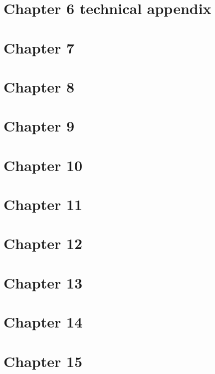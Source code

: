\documentclass[10pt]{article}
\begin{document}
  \newpage
  \section*{Chapter 6 technical appendix}
  
  
  \newpage
  \section*{Chapter 7}
  
  
  \newpage
  \section*{Chapter 8}
  
  
  \newpage
  \section*{Chapter 9}
  
  
  \newpage
  \section*{Chapter 10}
  
  
  \newpage
  \section*{Chapter 11}
  
	  
  \newpage
  \section*{Chapter 12}
  
  
  \newpage
  \section*{Chapter 13}
  
  
  \newpage
  \section*{Chapter 14}
  
  
  \newpage
  \section*{Chapter 15}
  
\end{document}
